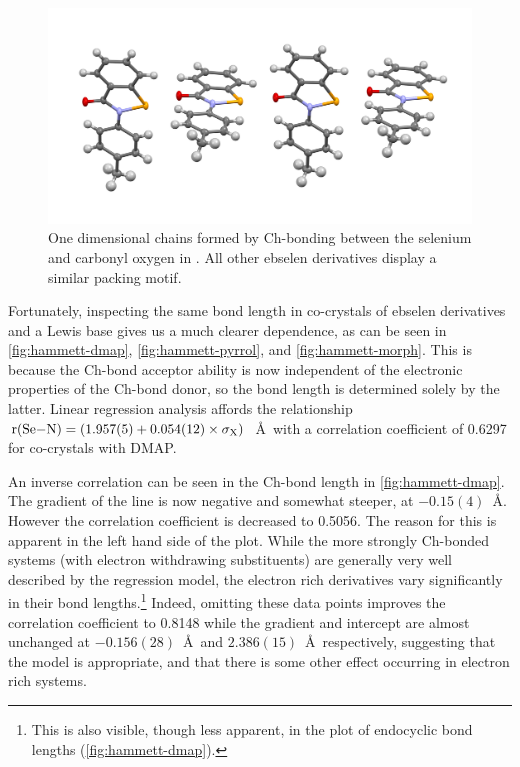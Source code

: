 \begin{refsection}
\begin{figure}
  \centering
  \includegraphics[width=0.6\linewidth]{Figures/ebs.me-packing.pdf}
  \caption{One dimensional chains formed by Ch-bonding between the selenium and carbonyl oxygen in . All other ebselen derivatives display a similar packing motif.}
  \label{fig:ebs-packing}
\end{figure}

Fortunately, inspecting the same bond length in co-crystals of ebselen derivatives and a Lewis base gives us a much clearer dependence, as can be seen in \cref{fig:hammett-dmap}, \cref{fig:hammett-pyrrol}, and \cref{fig:hammett-morph}.
This is because the Ch-bond acceptor ability is now independent of the electronic properties of the Ch-bond donor, so the  bond length is determined solely by the latter.
Linear regression analysis affords the relationship $\mathrm{r}(\ce{Se-N}) = (1.957(5) + 0.054(12) \times \sigma_{\mathrm{X}})$~\AA~with a correlation coefficient of 0.6297 for co-crystals with DMAP.

An inverse correlation can be seen in the  Ch-bond length in \cref{fig:hammett-dmap}.
The gradient of the line is now negative and somewhat steeper, at $-0.15(4)$~\AA.
However the correlation coefficient is decreased to 0.5056.
The reason for this is apparent in the left hand side of the plot.
While the more strongly Ch-bonded systems (with electron withdrawing substituents) are generally very well described by the regression model, the electron rich derivatives  vary significantly in their bond lengths.\footnote{This is also visible, though less apparent, in the plot of endocyclic bond lengths (\cref{fig:hammett-dmap}).}
Indeed, omitting these data points improves the correlation coefficient to 0.8148 while the gradient and intercept are almost unchanged at $-0.156(28)$~\AA~and $2.386(15)$~\AA~respectively, suggesting that the model is appropriate, and that there is some other effect occurring in electron rich systems.


\end{refsection}
